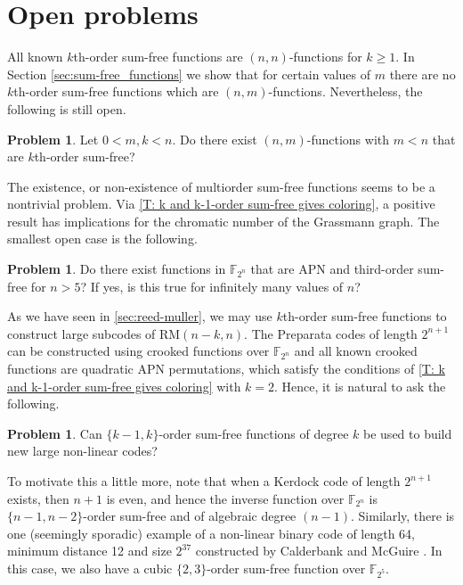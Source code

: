\documentclass[12pt]{article}
\theoremstyle{definition}
\newtheorem{problem}[thm]{Problem}
\newcommand{\F}{\mathbb F}
\newcounter{numb}
\begin{document}
\section{Open problems}



All known $k$th-order sum-free functions are $(n,n)$-functions for $k\geq 1$. In Section \ref{sec:sum-free_functions} we show that for certain values of $m$ there are no $k$th-order sum-free functions which are $(n,m)$-functions. Nevertheless, the following is still open.

\begin{problem}
    Let $0<m, k < n$. Do there exist $(n, m)$-functions with $m < n$ that are $k$th-order sum-free?
\end{problem}

The existence, or non-existence of multiorder sum-free functions seems to be a nontrivial problem. Via \cref{T: k and k-1-order sum-free gives coloring}, a positive result has implications for the chromatic number of the Grassmann graph. The smallest open case is the following.

\begin{problem}
    Do there exist functions in $\F_{2^n}$ that are APN and third-order sum-free for $n>5$? If yes, is this true for infinitely many values of $n$?
\end{problem}


As we have seen in \cref{sec:reed-muller}, we may use $k$th-order sum-free functions to construct large subcodes of RM$(n-k, n)$. 
The Preparata codes of length $2^{n+1}$ can be constructed using crooked functions over $\F_{2^n}$ and all known crooked functions are quadratic APN permutations, which satisfy the conditions of  \cref{T: k and k-1-order sum-free gives coloring} with $k=2$. Hence, it is natural to ask the following.
\begin{problem}\label{prob: 2}
    Can $\{k-1, k\}$-order sum-free functions of degree $k$ be used to build new large non-linear codes?
\end{problem}
To motivate this a little more, note that when a Kerdock code of length $2^{n+1}$ exists, then $n+1$ is even, and hence the inverse function over $\F_{2^{n}}$ is $\{n-1, n-2\}$-order sum-free and of algebraic degree $(n-1)$. Similarly, there is one (seemingly sporadic) example of a non-linear binary code of length 64, minimum distance 12 and size $2^{37}$ constructed by Calderbank and McGuire \cite{1997CalderbankCode}. In this case, we also have a cubic $\{ 2, 3\}$-order sum-free function over $\F_{2^5}$.
\end{document}
